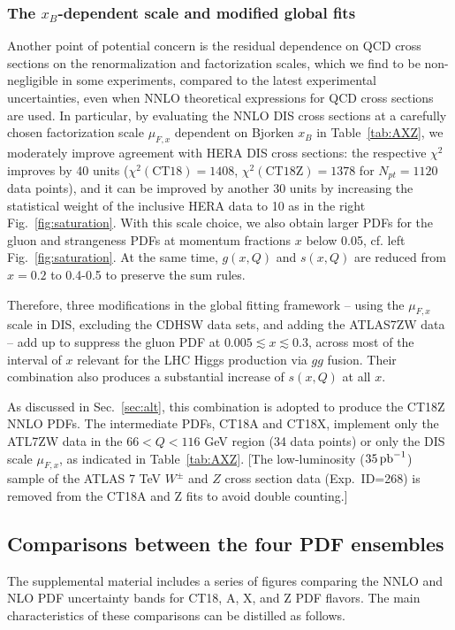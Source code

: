 \subsubsection{The $x_B$-dependent scale and modified global fits}
%
Another point of potential concern is the residual dependence on QCD
cross sections on the renormalization and factorization scales, which
we find to be non-negligible in some experiments, compared to the
latest experimental uncertainties, even when NNLO theoretical
expressions for QCD cross sections are used. In particular, by
evaluating the NNLO DIS cross sections at a carefully chosen
factorization scale $\mu_{F,x}$
dependent on Bjorken $x_B$ in Table~\ref{tab:AXZ},
we moderately improve agreement with HERA DIS cross sections:
the respective $\chi^2$ improves by 40 units
($\chi^2(\mbox{CT18})=1408$, $\chi^2(\mbox{CT18Z})=1378$ for
$N_{pt}=1120$ data points), and it can be improved by another 30 units
by increasing the statistical weight of the inclusive HERA data to 10 as in
the right Fig.~\ref{fig:saturation}. With this scale choice, we also obtain
larger PDFs for the gluon and strangeness PDFs at momentum fractions $x$
below 0.05, cf. left Fig.~\ref{fig:saturation}. At the same time,
$g(x,Q)$ and $s(x,Q)$ are reduced from $x=0.2$ to 0.4-0.5 to preserve
the sum rules.

Therefore, three modifications in the global fitting framework -- using
the $\mu_{F,x}$ scale in DIS, excluding the CDHSW data sets, and
adding the ATLAS7ZW data -- add up to suppress the gluon PDF at
$0.005 \lesssim x \lesssim 0.3$, across most of the interval
of $x$ relevant for the LHC
Higgs production via $gg$ fusion. Their combination also produces a
substantial increase of $s(x,Q)$ at all $x$. 

As discussed in Sec.~\ref{sec:alt}, this combination is adopted to
produce the CT18Z NNLO PDFs. The intermediate PDFs, CT18A and CT18X,
implement only the ATL7ZW data in the $66 < Q < 116$ GeV region (34
data points) or only the DIS scale $\mu_{F,x}$, as
indicated in Table~\ref{tab:AXZ}. [The low-luminosity
($35\, {\rm pb}^{-1}$) sample of the ATLAS 7 TeV  $W^\pm$ and $Z$
cross section data  (Exp.~ID=268) is removed from the CT18A and Z fits
to avoid double counting.]

\subsection{Comparisons between the four PDF ensembles}
\label{sec:CT18ZvsCT18}

The supplemental material includes a series of figures comparing the NNLO and NLO PDF uncertainty bands for CT18, A, X, and Z PDF flavors. The main characteristics of these comparisons can be distilled as follows.

